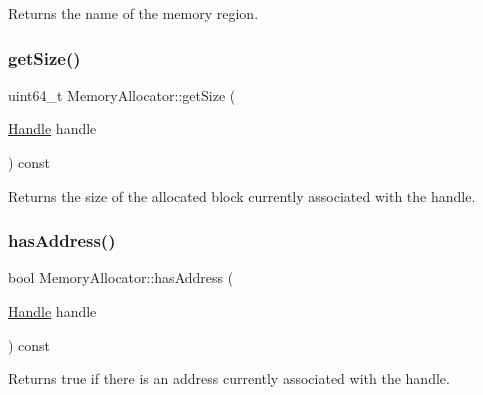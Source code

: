 \begin{DoxyReturn}{Returns}
the name of the memory region. 
\end{DoxyReturn}
\mbox{\label{classglow_1_1_memory_allocator_a8357f913799b90d5c2279ac863f5a8c8}} 
\subsubsection{\texorpdfstring{get\+Size()}{getSize()}}
{\footnotesize\ttfamily uint64\+\_\+t Memory\+Allocator\+::get\+Size (\begin{DoxyParamCaption}\item[{\hyperlink{classglow_1_1_memory_allocator_a8ebc21e1c9250f73f2e85aca3ae4ae9d}{Handle}}]{handle }\end{DoxyParamCaption}) const}

\begin{DoxyReturn}{Returns}
the size of the allocated block currently associated with the {\ttfamily handle}. 
\end{DoxyReturn}
\mbox{\label{classglow_1_1_memory_allocator_ab16a406e4055fc4ceb6ad9b006cefc5d}} 
\subsubsection{\texorpdfstring{has\+Address()}{hasAddress()}}
{\footnotesize\ttfamily bool Memory\+Allocator\+::has\+Address (\begin{DoxyParamCaption}\item[{\hyperlink{classglow_1_1_memory_allocator_a8ebc21e1c9250f73f2e85aca3ae4ae9d}{Handle}}]{handle }\end{DoxyParamCaption}) const}

\begin{DoxyReturn}{Returns}
true if there is an address currently associated with the {\ttfamily handle}. 
\end{DoxyReturn}
\mbox{\label{classglow_1_1_memory_allocator_a8148e0d8a4e2e2db2d3a01022a8ceaad}} 
